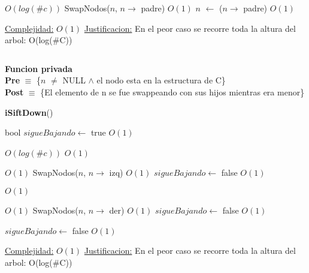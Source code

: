 \begin{Algoritmos}
\begin{algorithm}[H]
\begin{algorithmic}[1]
     \Comment $O(log(\#c))$
        \State SwapNodos($n$, $n \to$ padre) \Comment $O(1)$
        \State $n$ $\gets$ ($n \to$ padre) \Comment $O(1)$
    \EndWhile

    \medskip
    \Statex \underline{Complejidad:} $O(1)$
    \Statex \underline{Justificacion:} En el peor caso se recorre toda la altura del arbol: O(log($\#$C))
\end{algorithmic}
\end{algorithm}



$ $\newline

\textbf{Funcion privada}\\
\textbf{Pre} $\equiv$ \{$n$ $\neq$ NULL $\land$ el nodo esta en la estructura de C\}\\%
\textbf{Post} $\equiv$ \{El elemento de n se fue swappeando con sus hijos mientras era menor\}%
\begin{algorithm}[H]
{\textbf{iSiftDown}()}
\begin{algorithmic}[1]

    \State bool $sigueBajando \gets$ true \Comment $O(1)$

      \Comment $O(log(\#c))$
         \Comment $O(1)$ 

             \Comment $O(1)$
                \State SwapNodos($n$, $n \to$ izq) \Comment $O(1)$
            \Else
                \State $sigueBajando \gets$ false \Comment $O(1)$
            \EndIf

        \Else
             \Comment $O(1)$
            
                 \Comment $O(1)$
                    \State SwapNodos($n$, $n \to$ der) \Comment $O(1)$
                \Else
                    \State $sigueBajando \gets$ false \Comment $O(1)$
                \EndIf
            
            \Else
                \State $sigueBajando \gets$ false \Comment $O(1)$
            \EndIf
        \EndIf


    \EndWhile 

    \medskip
    \Statex \underline{Complejidad:} $O(1)$
    \Statex \underline{Justificacion:} En el peor caso se recorre toda la altura del arbol: O(log($\#$C))
\end{algorithmic}
\end{algorithm}




\end{Algoritmos}
